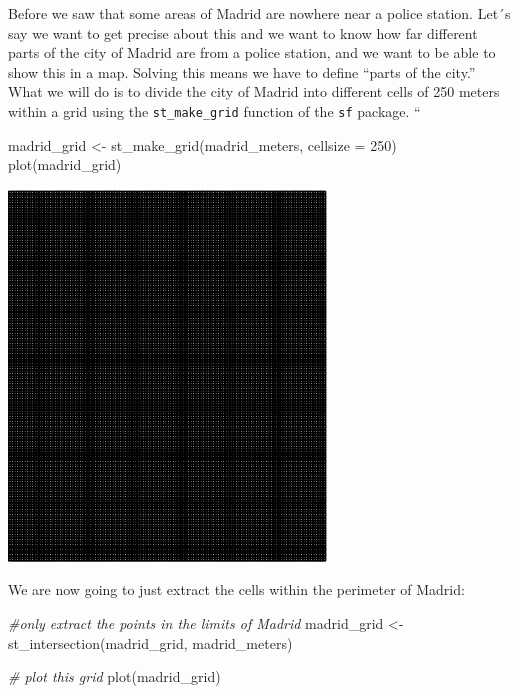 \documentclass[
]{book}
\newenvironment{Shaded}{\begin{snugshade}}{\end{snugshade}}
\newcommand{\AttributeTok}[1]{\textcolor[rgb]{0.77,0.63,0.00}{#1}}
\newcommand{\CommentTok}[1]{\textcolor[rgb]{0.56,0.35,0.01}{\textit{#1}}}
\newcommand{\DecValTok}[1]{\textcolor[rgb]{0.00,0.00,0.81}{#1}}
\newcommand{\FunctionTok}[1]{\textcolor[rgb]{0.00,0.00,0.00}{#1}}
\newcommand{\NormalTok}[1]{#1}
\newcommand{\OtherTok}[1]{\textcolor[rgb]{0.56,0.35,0.01}{#1}}
\begin{document}
Before we saw that some areas of Madrid are nowhere near a police station. Let´s say we want to get precise about this and we want to know how far different parts of the city of Madrid are from a police station, and we want to be able to show this in a map. Solving this means we have to define ``parts of the city.'' What we will do is to divide the city of Madrid into different cells of 250 meters within a grid using the \texttt{st\_make\_grid} function of the \texttt{sf} package.
``

\begin{Shaded}
\begin{Highlighting}[]
\NormalTok{madrid\_grid }\OtherTok{\textless{}{-}} \FunctionTok{st\_make\_grid}\NormalTok{(madrid\_meters,  }\AttributeTok{cellsize =} \DecValTok{250}\NormalTok{)}
\FunctionTok{plot}\NormalTok{(madrid\_grid)}
\end{Highlighting}
\end{Shaded}

\includegraphics{crime_mapping_files/figure-latex/unnamed-chunk-68-1.pdf}

We are now going to just extract the cells within the perimeter of Madrid:

\begin{Shaded}
\begin{Highlighting}[]
\CommentTok{\#only extract the points in the limits of Madrid}
\NormalTok{madrid\_grid }\OtherTok{\textless{}{-}} \FunctionTok{st\_intersection}\NormalTok{(madrid\_grid, madrid\_meters)   }

\CommentTok{\# plot this grid}
\FunctionTok{plot}\NormalTok{(madrid\_grid)}
\end{Highlighting}
\end{Shaded}
\end{document}
